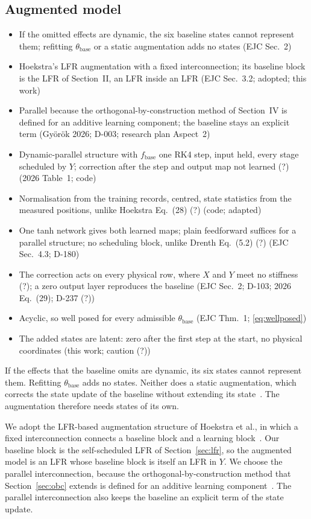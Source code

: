 \subsection{Augmented model}\label{sec:aug_structure}
\ifdraft
\begin{itemize}
\item If the omitted effects are dynamic, the six baseline states cannot represent them; refitting $\theta_{\mathrm{base}}$ or a static augmentation adds no states (EJC Sec.~2)
\item Hoekstra's LFR augmentation with a fixed interconnection; its baseline block is the LFR of Section~II, an LFR inside an LFR (EJC Sec.~3.2; adopted; this work)
\item Parallel because the orthogonal-by-construction method of Section~IV is defined for an additive learning component; the baseline stays an explicit term (Gy\"or\"ok 2026; D-003; research plan Aspect~2)
\item Dynamic-parallel structure with $f_{\mathrm{base}}$ one RK4 step, input held, every stage scheduled by $Y$; correction after the step and output map not learned (?) (2026 Table~1; code)
\item Normalisation from the training records, centred, state statistics from the measured positions, unlike Hoekstra Eq.~(28) (?) (code; adapted)
\item One tanh network gives both learned maps; plain feedforward suffices for a parallel structure; no scheduling block, unlike Drenth Eq.~(5.2) (?) (EJC Sec.~4.3; D-180)
\item The correction acts on every physical row, where $X$ and $Y$ meet no stiffness (?); a zero output layer reproduces the baseline (EJC Sec.~2; D-103; 2026 Eq.~(29); D-237 (?))
\item Acyclic, so well posed for every admissible $\theta_{\mathrm{base}}$ (EJC Thm.~1; \eqref{eq:wellposed})
\item The added states are latent: zero after the first step at the start, no physical coordinates (this work; caution (?))
\end{itemize}
\fi

If the effects that the baseline omits are dynamic, its six states cannot
represent them.
Refitting $\theta_{\mathrm{base}}$ adds no states.
Neither does a static augmentation, which corrects the state update of the
baseline without extending its state~\cite[Sec.~2]{hoekstra2025lfr}.
The augmentation therefore needs states of its own.

We adopt the LFR-based augmentation structure of Hoekstra et al., in which a
fixed interconnection connects a baseline block and a learning
block~\cite[Sec.~3.2]{hoekstra2025lfr}.
Our baseline block is the self-scheduled LFR of Section~\ref{sec:lfr}, so the
augmented model is an LFR whose baseline block is itself an LFR in $Y$.
We choose the parallel interconnection, because the orthogonal-by-construction
method that Section~\ref{sec:obc} extends is defined for an additive learning
component~\cite{gyorok2026obc}.
The parallel interconnection also keeps the baseline an explicit term of the
state update.

